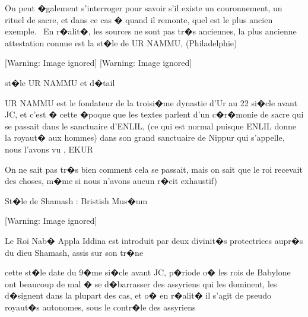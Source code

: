 \documentclass{article}
\begin{document}
\bigskip


\bigskip

On peut �galement s'interroger pour savoir s'il existe un couronnement, un rituel de sacre, et dans ce cas � quand il remonte, quel est le plus ancien exemple. \ En r�alit�, les sources ne sont pas tr�s anciennes, la plus ancienne attestation connue est la st�le de UR NAMMU, (Philadelphie)


\bigskip


\bigskip

  [Warning: Image ignored] %
   [Warning: Image ignored] %
 


\bigskip

st�le UR NAMMU et d�tail


\bigskip


\bigskip

UR NAMMU est le fondateur de la troisi�me dynastie d'Ur au 22 si�cle avant JC, et c'est � cette �poque que les textes parlent d'un c�r�monie de sacre qui se passait dans le sanctuaire d'ENLIL, (ce qui est normal puisque ENLIL donne la royaut� aux hommes) dans son grand sanctuaire de Nippur qui s'appelle, nous l'avons vu , EKUR

On ne sait pas tr�s bien comment cela se passait, mais on sait que le roi recevait des choses, m�me si nous n'avons aucun r�cit exhaustif)


\bigskip


\bigskip

St�le de Shamash : Bristish Mus�um


\bigskip

  [Warning: Image ignored] %
 


\bigskip

Le Roi Nab� Appla Iddina est introduit par deux divinit�s protectrices aupr�s du dieu Shamash, assis sur son tr�ne


\bigskip


\bigskip

cette st�le date du 9�me si�cle avant JC, p�riode o� les rois de Babylone ont beaucoup de mal � se d�barrasser des assyriens qui les dominent, les d�signent dans la plupart des cas, et o� en r�alit� il s'agit de pseudo royaut�s autonomes, sous le contr�le des assyriens
\end{document}
